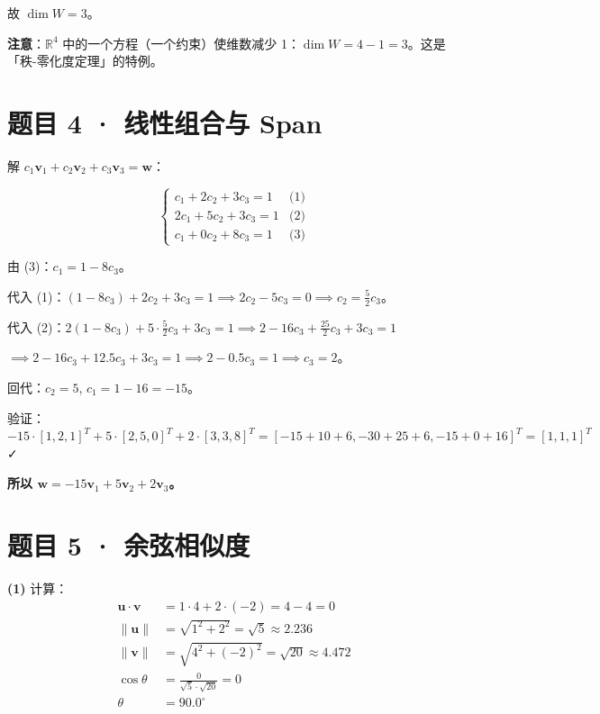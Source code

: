 \documentclass[12pt]{ctexart}
\begin{document}
故 $\dim W = 3$。

\textbf{注意}：$\mathbb{R}^4$ 中的一个方程（一个约束）使维数减少 1：$\dim W = 4 - 1 = 3$。这是「秩-零化度定理」的特例。

\section*{题目 4 · 线性组合与 Span}

解 $c_1\mathbf{v}_1 + c_2\mathbf{v}_2 + c_3\mathbf{v}_3 = \mathbf{w}$：

\[
\begin{cases}
c_1 + 2c_2 + 3c_3 = 1 & \text{(1)}\\
2c_1 + 5c_2 + 3c_3 = 1 & \text{(2)}\\
c_1 + 0c_2 + 8c_3 = 1   & \text{(3)}
\end{cases}
\]

由 (3)：$c_1 = 1 - 8c_3$。

代入 (1)：$(1-8c_3) + 2c_2 + 3c_3 = 1 \implies 2c_2 - 5c_3 = 0 \implies c_2 = \frac{5}{2}c_3$。

代入 (2)：$2(1-8c_3) + 5 \cdot \frac{5}{2}c_3 + 3c_3 = 1 \implies 2 - 16c_3 + \frac{25}{2}c_3 + 3c_3 = 1$

$\implies 2 - 16c_3 + 12.5c_3 + 3c_3 = 1 \implies 2 - 0.5c_3 = 1 \implies c_3 = 2$。

回代：$c_2 = 5$, $c_1 = 1 - 16 = -15$。

验证：$-15 \cdot [1,2,1]^T + 5 \cdot [2,5,0]^T + 2 \cdot [3,3,8]^T = [-15+10+6, -30+25+6, -15+0+16]^T = [1,1,1]^T$ ✓

\textbf{所以 $\mathbf{w} = -15\mathbf{v}_1 + 5\mathbf{v}_2 + 2\mathbf{v}_3$。}

\section*{题目 5 · 余弦相似度}

\textbf{(1)} 计算：
\begin{align*}
\mathbf{u} \cdot \mathbf{v} &= 1 \cdot 4 + 2 \cdot (-2) = 4 - 4 = 0 \\
\|\mathbf{u}\| &= \sqrt{1^2 + 2^2} = \sqrt{5} \approx 2.236 \\
\|\mathbf{v}\| &= \sqrt{4^2 + (-2)^2} = \sqrt{20} \approx 4.472 \\
\cos\theta &= \frac{0}{\sqrt{5} \cdot \sqrt{20}} = 0 \\
\theta &= 90.0^\circ
\end{align*}
\end{document}
